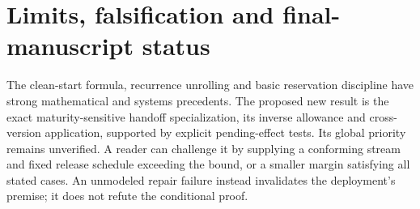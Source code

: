 \section{Limits, falsification and final-manuscript status}
The clean-start formula, recurrence unrolling and basic reservation discipline have strong mathematical and systems precedents. The proposed new result is the exact maturity-sensitive handoff specialization, its inverse allowance and cross-version application, supported by explicit pending-effect tests. Its global priority remains unverified. A reader can challenge it by supplying a conforming stream and fixed release schedule exceeding the bound, or a smaller margin satisfying all stated cases. An unmodeled repair failure instead invalidates the deployment's premise; it does not refute the conditional proof.

